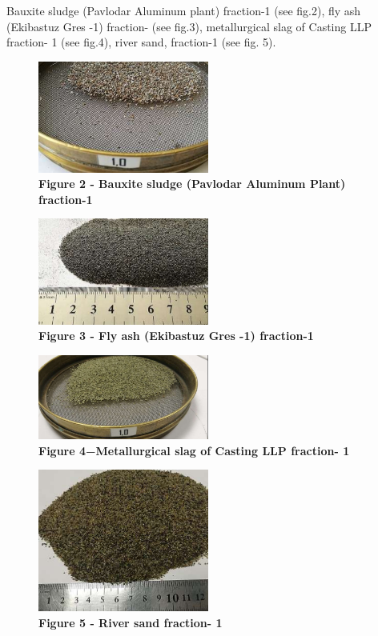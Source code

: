 Bauxite sludge (Pavlodar Aluminum plant) fraction-1 (see fig.2), fly ash
(Ekibastuz Gres -1) fraction- (see fig.3), metallurgical slag of Casting
LLP fraction- 1 (see fig.4), river sand, fraction-1 (see fig. 5).

\begin{figure}[H]
	\centering
	\includegraphics[width=0.5\textwidth]{assets/268}
	\caption*{\bfseries Figure 2 - Bauxite sludge (Pavlodar Aluminum Plant) fraction-1}
\end{figure}


\begin{figure}[H]
	\centering
	\includegraphics[width=0.5\textwidth]{assets/269}
	\caption*{\bfseries Figure 3 - Fly ash (Ekibastuz Gres -1) fraction-1}
\end{figure}



\begin{figure}[H]
	\centering
	\includegraphics[width=0.5\textwidth]{assets/270}
	\caption*{\bfseries Figure 4−Metallurgical slag of Casting LLP fraction- 1}
\end{figure}



\begin{figure}[H]
	\centering
	\includegraphics[width=0.5\textwidth]{assets/271}
	\caption*{\bfseries Figure 5 - River sand fraction- 1}
\end{figure}



